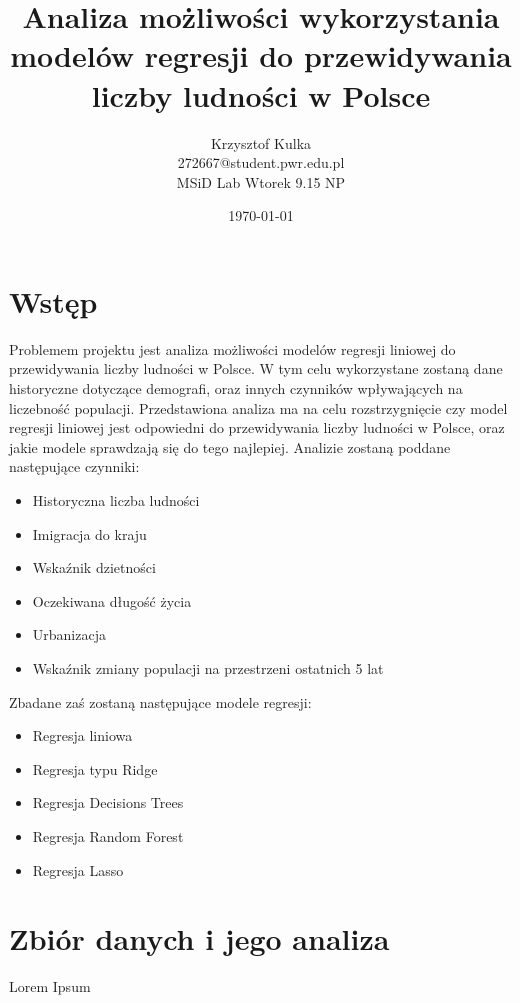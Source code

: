 \documentclass[11pt]{article}
\title{ Analiza możliwości wykorzystania modelów regresji do przewidywania liczby ludności w Polsce}
\author{ Krzysztof Kulka
        \\ 272667@student.pwr.edu.pl \\ MSiD Lab Wtorek 9.15 NP }
\date{\today}
\begin{document}
\maketitle	
\pagebreak

\tableofcontents
 \pagebreak


\section{Wstęp}
Problemem projektu jest analiza możliwości modelów regresji liniowej do przewidywania liczby ludności w Polsce. W tym celu wykorzystane zostaną dane historyczne dotyczące demografi, oraz innych czynników wpływających na liczebność populacji.
Przedstawiona analiza ma na celu rozstrzygnięcie czy model regresji liniowej jest odpowiedni do przewidywania liczby ludności w Polsce, oraz jakie modele sprawdzają się do tego najlepiej.
Analizie zostaną poddane następujące czynniki:
\begin{itemize}
\item Historyczna liczba ludności
\item Imigracja do kraju
\item Wskaźnik dzietności
\item Oczekiwana długość życia
\item Urbanizacja
\item Wskaźnik zmiany populacji na przestrzeni ostatnich 5 lat
\end{itemize}
Zbadane zaś zostaną następujące modele regresji:
\begin{itemize}
\item Regresja liniowa
\item Regresja typu Ridge
\item Regresja Decisions Trees
\item Regresja Random Forest
\item Regresja Lasso
\end{itemize}
\section{Zbiór danych i jego analiza}
Lorem Ipsum \\

\end{document}
